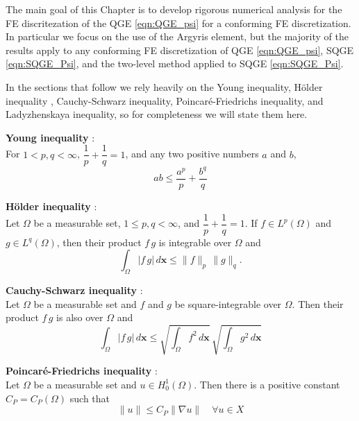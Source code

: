 The main goal of this Chapter is to develop rigorous numerical analysis for
the FE discritezation of the QGE \eqref{eqn:QGE_psi} for a conforming FE
discretization. In particular we focus on the use of the Argyris element, but
the majority of the results apply to any conforming FE discretization of QGE
\eqref{eqn:QGE_psi}, SQGE \eqref{eqn:SQGE_Psi}, and the two-level method applied
to SQGE \eqref{eqn:SQGE_Psi}.

In the sections that follow we rely heavily on the Young inequality, H\"older
inequality , Cauchy-Schwarz inequality, Poincar\'e-Friedrichs inequality, and
Ladyzhenskaya inequality, so for completeness we will state them here.

\begin{definition} \label{def:Young}
  \textbf{Young inequality} \cite{Royden2010}:\\
  For $1 < p,q < \infty$, $\dfrac{1}{p} + \dfrac{1}{q} = 1$, and any two
  positive numbers $a$ and $b$,
  \begin{equation}
    ab \le \frac{a^p}{p} + \frac{b^q}{q}
    \label{eqn:Young}
  \end{equation}
\end{definition}
\begin{definition} \label{def:Holder}
  \textbf{H\"older inequality} \cite{Royden2010}:\\
  Let $\Omega$ be a measurable set, $1\le p,q < \infty$, and $\dfrac{1}{p} +
  \dfrac{1}{q} = 1$. If $f \in L^p(\Omega)$ and $g \in L^q(\Omega)$, then their
  product $f\, g$ is integrable over $\Omega$ and
  \begin{equation}
    \int_{\Omega}\! |f\, g| \, d\mathbf{x} \le \|f\|_p\, \|g\|_q.
    \label{eqn:Holder}
  \end{equation}
\end{definition}
\begin{definition} \label{def:Cauchy-Schwarz}
  \textbf{Cauchy-Schwarz inequality} \cite{Royden2010}:\\
  Let $\Omega$ be a measurable set and $f$ and $g$ be square-integrable over
  $\Omega$. Then their product $f\, g$ is also over $\Omega$ and
  \begin{equation}
    \int_{\Omega}\! |f\,g|\, d\mathbf{x} \le \sqrt{\int_{\Omega}\! f^2 \,
      d\mathbf{x}}\, \sqrt{\int_{\Omega}\! g^2 \, d\mathbf{x}}
    \label{eqn:Cauchy}
  \end{equation}

\end{definition}
\begin{definition} \label{def:Poincare}
  \textbf{Poincar\'e-Friedrichs inequality} \cite{Layton08}:\\
  Let $\Omega$ be a measurable set and $u \in H^1_0(\Omega)$. Then there is a
  positive constant $C_P = C_P(\Omega)$ such that
  \begin{equation}
    \|u\| \le C_P \|\nabla u\| \quad \forall u \in X
    \label{eqn:Poincare}
  \end{equation}
\end{definition}
